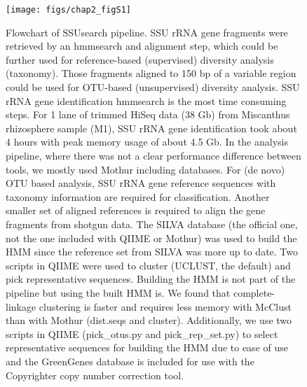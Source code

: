 \documentclass[]{msu-thesis}
\begin{document}
\begin{figure}[tbph!]
  \centering
  \texttt{[image: figs/chap2\_figS1]}
  \caption[Flowchart of SSUsearch pipeline]{Flowchart of SSUsearch pipeline. SSU rRNA gene fragments were retrieved by an hmmsearch and alignment step, which could be further used for reference-based (supervised) diversity analysis (taxonomy). Those fragments aligned to 150 bp of a variable region could be used for OTU-based (unsupervised) diversity analysis. SSU rRNA gene identification hmmsearch is the most time consuming steps. For 1 lane of trimmed HiSeq data (38 Gb) from Miscanthus rhizosphere sample (M1), SSU rRNA gene identification took about 4 hours with peak memory usage of about 4.5 Gb. In the analysis pipeline, where there was not a clear performance difference between tools, we mostly used Mothur including databases. For (de novo) OTU based analysis, SSU rRNA gene reference sequences with taxonomy information are required for classification. Another smaller set of aligned references is required to align the gene fragments from shotgun data. The SILVA database (the official one, not the one included with QIIME or Mothur) was used to build the HMM since the reference set from SILVA was more up to date. Two scripts in QIIME were used to cluster (UCLUST, the default) and pick representative sequences. Building the HMM is not part of the pipeline but using the built HMM is. We found that complete-linkage clustering is faster and requires less memory with McClust than with Mothur (dist.seqs and cluster). Additionally, we use two scripts in QIIME (pick\_otus.py and pick\_rep\_set.py) to select representative sequences for building the HMM due to ease of use and the GreenGenes database is included for use with the Copyrighter copy number correction tool.}
  \label{fig:chap2FigS1}
\end{figure}
\end{document}
